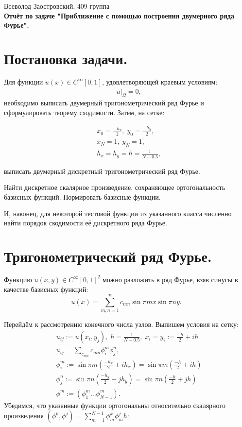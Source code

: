 \documentclass[14pt,a4paper]{extarticle}
\newcommand{\1}{\mathbbm{1}}
\begin{document}
\begin{center}

{Всеволод Заостровский, 409 группа}\\
{\bfseries Отчёт по задаче "Приближение с помощью построения двумерного ряда Фурье".\\}
\vspace{1cm}

\end{center}

\section{Постановка задачи.}
Для функции $u(x) \in C^{\infty}[0, 1]$, удовлетворяющей краевым условиям:
\begin{align*}
    & u |_{\Omega} = 0,
\end{align*}
необходимо выписать двумерный тригонометрический ряд Фурье и сформулировать теорему сходимости. Затем, на сетке:

\begin{align*}
    & x_0 = \frac{-h_x}{2}, \; y_0 = \frac{-h_y}{2},\\
    & x_N = 1, \; y_N = 1, \\
    & h_x = h_y = h = \frac{1}{N - 0.5},
\end{align*}     

выписать двумерный дискретный тригонометрический ряд Фурье. \par
Найти дискретное скалярное произведение, сохраняющее ортогональность базисных функций. 
Нормировать базисные функции. 
\par
И, наконец, для некоторой тестовой функции из указанного класса численно найти порядок скодимости её дискретного ряда Фурье.

\section{Тригонометрический ряд Фурье.}
Функцию $u(x, y) \in C^{\infty}[0, 1]^2$ можно разложить в ряд Фурье, 
взяв синусы в качестве базисных функций:
\begin{equation*}
    u(x) = \sum_{m, n = 1}^{\infty} c_{mn} \sin {\pi m x} \sin {\pi n y}.
\end{equation*}
\par
Перейдём к рассмотрению конечного числа узлов. Выпишем условия на сетку:
\begin{align*}
    & u_{ij} := u(x_i, y_j), \; h = \frac{1}{N - 0.5}, \; x_i = y_i := \frac{-h}{2} + i h \\
    & u_{ij} = \sum_{c_{mn}} c_{mn} \phi_i^m \phi_j^n, \\
    & \phi_i^m := \sin{\pi m (\frac{-h_x}{2} + i h_x)} = \sin{\pi m (\frac{-h}{2} + i h)} \\
    & \phi_j^n := \sin{\pi n (\frac{-h_y}{2} + j h_y)} = \sin{\pi n (\frac{-h}{2} + j h)} \\
    & \phi^m := (\phi_1^m ... \phi_{N-1}^m).
\end{align*} 
Убедимся, что указанные функции ортогональны относительно скалярного произведения 
${(\phi^k, \phi^j) = \sum_{m = 1}^{N - 1}\phi_m^k \phi_m^j h}$:
\end{document}
